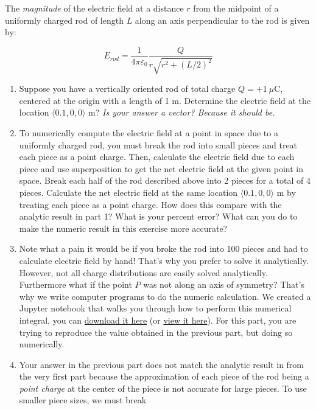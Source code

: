 \documentclass[11pt]{article}
\begin{document}
The \emph{magnitude} of the electric field at a distance \(r\) from the
midpoint of a uniformly charged rod of length \(L\) along an axis
perpendicular to the rod is given by:

\[E_{rod}=\frac{1}{4\pi\varepsilon_0}\frac{Q}{r\sqrt{r^2+(L/2)^2}}\]

\begin{enumerate}
\def\labelenumi{\arabic{enumi}.}
\item
  Suppose you have a vertically oriented rod of total charge
  \(Q=+1\ \mu\)C, centered at the origin with a length of 1 m. Determine
  the electric field at the location \(\langle 0.1 , 0 , 0 \rangle\) m?
  \emph{Is your answer a vector? Because it should be.}
\item
  To numerically compute the electric field at a point in space due to a
  uniformly charged rod, you must break the rod into small pieces and
  treat each piece as a point charge. Then, calculate the electric field
  due to each piece and use superposition to get the net electric field
  at the given point in space. Break each half of the rod described
  above into 2 pieces for a total of 4 pieces. Calculate the net
  electric field at the same location \(\langle 0.1 , 0 , 0 \rangle\) m
  by treating each piece as a point charge. How does this compare with
  the analytic result in part 1? What is your percent error? What can
  you do to make the numeric result in this exercise more accurate?
\item
  Note what a pain it would be if you broke the rod into 100 pieces and
  had to calculate electric field by hand! That's why you prefer to
  solve it analytically. However, not all charge distributions are
  easily solved analytically. Furthermore what if the point \(P\) was
  not along an axis of symmetry? That's why we write computer programs
  to do the numeric calculation. We created a Jupyter notebook that
  walks you through how to perform this numerical integral, you can
  \href{../jupyter/HW2-ElectricFieldChargedRod.ipynb}{download it here}
  (or
  \href{https://github.com/dannycab/phy481msu/blob/gh-pages/jupyter/HW2-ElectricFieldChargedRod.ipynb}{view
  it here}). For this part, you are trying to reproduce the value
  obtained in the previous part, but doing so numerically.
\item
  Your answer in the previous part does not match the analytic result in
  from the very first part because the approximation of each piece of
  the rod being a \emph{point charge} at the center of the piece is not
  accurate for large pieces. To use smaller piece sizes, we must break

\end{enumerate}
\end{document}
